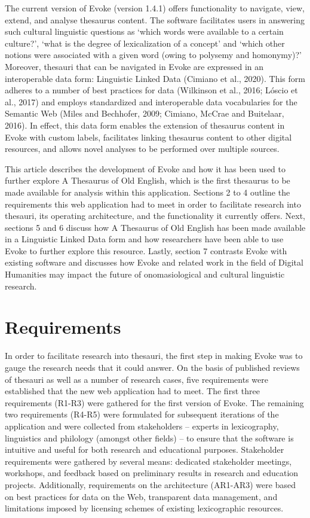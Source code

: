 The current version of Evoke (version 1.4.1) offers functionality to navigate, view, extend, and analyse thesaurus content.  The software facilitates users in answering such cultural linguistic questions as ‘which words were available to a certain culture?’, ‘what is the degree of lexicalization of a concept’ and ‘which other notions were associated with a given word (owing to polysemy and homonymy)?’ Moreover, thesauri that can be navigated in Evoke are expressed in an interoperable data form: Linguistic Linked Data (Cimiano et al., 2020). This form adheres to a number of best practices for data (Wilkinson et al., 2016; Lóscio et al., 2017) and employs standardized and interoperable data vocabularies for the Semantic Web (Miles and Bechhofer, 2009; Cimiano, McCrae and Buitelaar, 2016). In effect, this data form enables the extension of thesaurus content in Evoke with custom labels, facilitates linking thesaurus content to other digital resources, and allows novel analyses to be performed over multiple sources. 

This article describes the development of Evoke and how it has been used to further explore A Thesaurus of Old English, which is the first thesaurus to be made available for analysis within this application. Sections 2 to 4 outline the requirements this web application had to meet in order to facilitate research into thesauri, its operating architecture, and the functionality it currently offers. Next, sections 5 and 6 discuss how A Thesaurus of Old English has been made available in a Linguistic Linked Data form and how researchers have been able to use Evoke to further explore this resource. Lastly, section 7 contrasts Evoke with existing software and discusses how Evoke and related work in the field of Digital Humanities may impact the future of onomasiological and cultural linguistic research. 


\section{Requirements}

In order to facilitate research into thesauri, the first step in making Evoke was to gauge the research needs that it could answer. On the basis of published reviews of thesauri as well as a number of research cases, five requirements were established that the new web application had to meet. The first three requirements (R1-R3) were gathered for the first version of Evoke. The remaining two requirements (R4-R5) were formulated for subsequent iterations of the application and were collected from stakeholders – experts in lexicography, linguistics and philology (amongst other fields) – to ensure that the software is intuitive and useful for both research and educational purposes. Stakeholder requirements were gathered by several means: dedicated stakeholder meetings, workshops, and feedback based on preliminary results in research and education projects. Additionally, requirements on the architecture (AR1-AR3) were based on best practices for data on the Web, transparent data management, and limitations imposed by licensing schemes of existing lexicographic resources.

